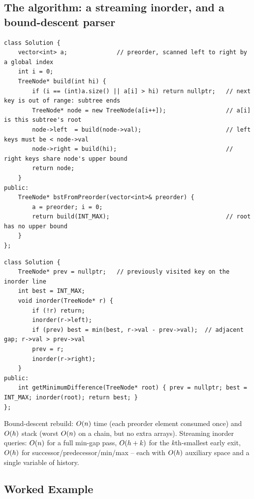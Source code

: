 \subsection{The algorithm: a streaming inorder, and a bound-descent parser}

\begin{lstlisting}[caption={Reconstruct a BST from a preorder array by bound descent (LeetCode 1008)}, label={lst:c05-build}]
class Solution {
    vector<int> a;              // preorder, scanned left to right by a global index
    int i = 0;
    TreeNode* build(int hi) {
        if (i == (int)a.size() || a[i] > hi) return nullptr;   // next key is out of range: subtree ends
        TreeNode* node = new TreeNode(a[i++]);                 // a[i] is this subtree's root
        node->left  = build(node->val);                        // left keys must be < node->val
        node->right = build(hi);                               // right keys share node's upper bound
        return node;
    }
public:
    TreeNode* bstFromPreorder(vector<int>& preorder) {
        a = preorder; i = 0;
        return build(INT_MAX);                                 // root has no upper bound
    }
};
\end{lstlisting}

\begin{lstlisting}[caption={Minimum absolute difference of any two keys -- streaming inorder with a predecessor pointer}, label={lst:c05-mindiff}]
class Solution {
    TreeNode* prev = nullptr;   // previously visited key on the inorder line
    int best = INT_MAX;
    void inorder(TreeNode* r) {
        if (!r) return;
        inorder(r->left);
        if (prev) best = min(best, r->val - prev->val);  // adjacent gap; r->val > prev->val
        prev = r;
        inorder(r->right);
    }
public:
    int getMinimumDifference(TreeNode* root) { prev = nullptr; best = INT_MAX; inorder(root); return best; }
};
\end{lstlisting}
\begin{complexitybox}
Bound-descent rebuild: $O(n)$ time (each preorder element consumed once) and $O(h)$ stack
(worst $O(n)$ on a chain, but no extra arrays). Streaming inorder queries: $O(n)$ for a full
min-gap pass, $O(h+k)$ for the $k$th-smallest early exit, $O(h)$ for successor/predecessor/min/max
-- each with $O(h)$ auxiliary space and a single variable of history.
\end{complexitybox}

\subsection{Worked Example}

